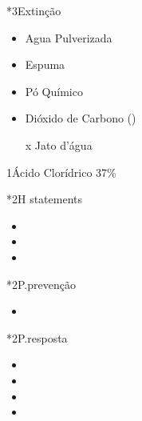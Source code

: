 \begin{sectionBox}
\begin{multicols}{2}
        \begin{sectionBox}*3{Extinção}
            \begin{itemize}
                \item Agua Pulverizada
                \item Espuma
                \item Pó Químico
                \item Dióxido de Carbono ()
                \item[x] Jato d'água
            \end{itemize}
        \end{sectionBox}

    \end{multicols}
\end{sectionBox}









\begin{sectionBox}1{Ácido Clorídrico 37\%}

    \begin{sectionBox}{}
        \begin{multicols}{3}
        \end{multicols}
    \end{sectionBox}

    \begin{sectionBox}*2{H statements}
        \begin{itemize}
            \item {}
            \item {}
            \item {}
        \end{itemize}
    \end{sectionBox}

    \begin{sectionBox}*2{P.prevenção}
        \begin{itemize}
            \item {}
        \end{itemize}
    \end{sectionBox}

    \begin{sectionBox}*2{P.resposta}
        \begin{itemize}
            \item {}
            \item {}
            \item {}
            \item {}
        \end{itemize}
    \end{sectionBox}

\end{sectionBox}









